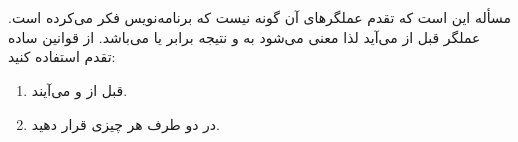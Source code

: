 \section{}
\paragraph{}\label{answer:49}
مسأله این است که تقدم عملگرهای  آن گونه نیست که برنامه‌نویس فکر می‌کرده است. عملگر \lr{\texttt{+}} قبل از \lr{\texttt{<<}} می‌آید لذا  معنی می‌شود به  و نتیجه برابر  یا  می‌باشد. از قوانین ساده تقدم  استفاده کنید:
\begin{enumerate}
    \item \lr{\texttt{*, /, \%}}  قبل از \lr{\texttt{+}} و  می‌آیند.
    \item در دو طرف هر چیزی \lr{\texttt{()}} قرار دهید.
\end{enumerate}
